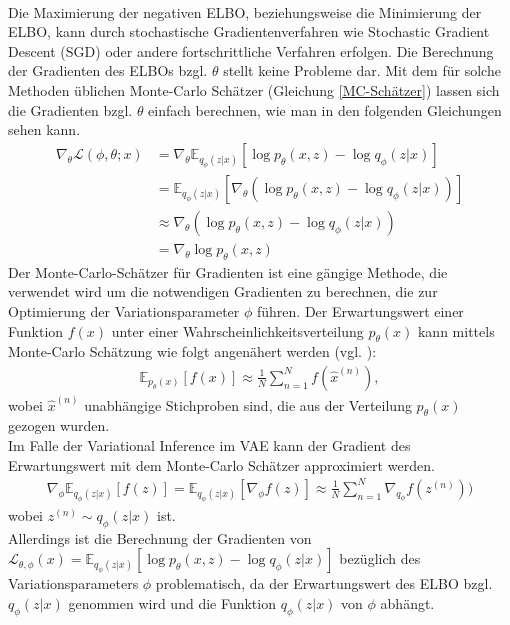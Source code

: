 \documentclass[%
thesis=student,%
coverpage=false,%
titlepage=false,%
headmarks=true, %
german,%
font=libertine, %
math=newpxtx, %
BCOR=5mm,%
coverBCOR=11mm%
]{tumbook}
\theoremstyle{break}
\begin{document}
\\
Die Maximierung der negativen ELBO, beziehungsweise die Minimierung der ELBO, kann durch stochastische Gradientenverfahren wie Stochastic Gradient Descent (SGD) oder andere fortschrittliche Verfahren erfolgen. Die Berechnung der Gradienten des ELBOs bzgl. $\theta$ stellt keine Probleme dar. Mit dem für solche Methoden üblichen Monte-Carlo Schätzer (Gleichung \ref{MC-Schätzer}) lassen sich die Gradienten bzgl. $\theta$ einfach berechnen, wie man in den folgenden Gleichungen sehen kann.\\
\begin{align}
	\nabla_\theta \mathcal{L}(\phi, \theta;x) &=\nabla_\theta \mathbb{E}_{q_\phi(z|x)}[\log p_\theta(x,z)-\log q_\phi(z|x)] \\
	&=  \mathbb{E}_{q_\phi(z|x)}[\nabla_\theta (\log p_\theta(x,z)-\log q_\phi(z|x))] \\
	&\approx \nabla_\theta  (\log p_\theta(x,z)-\log q_\phi(z|x))\\
	&= \nabla_\theta  \log p_\theta(x,z) \label{MC-Schätzer}
\end{align}
Der Monte-Carlo-Schätzer für Gradienten ist eine gängige Methode, die verwendet wird um die notwendigen Gradienten zu berechnen, die zur Optimierung der Variationsparameter $\phi$ führen. Der Erwartungswert einer Funktion $f(x)$ unter einer Wahrscheinlichkeitsverteilung $p_\theta(x)$ kann mittels Monte-Carlo Schätzung wie folgt angenähert werden 
(vgl. \cite{MonteCarloEstimation}): 
\begin{align}
	\mathbb{E}_{p_\theta(x)}[f(x)] \approx \frac{1}{N} \sum_{n=1}^{N}f(\hat{x}^{(n)}),
\end{align}
wobei $\hat{x}^{(n)}$ unabhängige Stichproben sind, die aus der Verteilung $p_\theta(x)$ gezogen wurden.\\
Im Falle der Variational Inference im VAE kann der Gradient des Erwartungswert mit dem Monte-Carlo Schätzer approximiert werden.\\
\begin{align}
	\nabla_\phi \mathbb{E}_{q_\phi(z|x)}[f(z)]= \mathbb{E}_{q_\phi(z|x)}[\nabla_{\phi} f(z)] \approx \frac{1}{N} \sum_{n=1}^{N}\nabla_{q_\phi}f(z^{(n)})) \label{MonteCarloEstimator}
\end{align}
wobei $z^{(n)} \sim q_\phi(z|x)$ ist.\\
Allerdings ist die Berechnung
der Gradienten von $\mathcal{L}_{\theta,\phi}(x) = \mathbb{E}_{q_\phi(z|x)}\left[\log p_\theta(x,z)- \log q_\phi(z|x)\right]$ bezüglich des Variationsparameters $\phi$ problematisch, da der Erwartungswert des ELBO bzgl. $q_\phi(z|x)$ genommen wird und die Funktion $q_\phi(z|x)$  von $\phi$ abhängt. 
\end{document}
